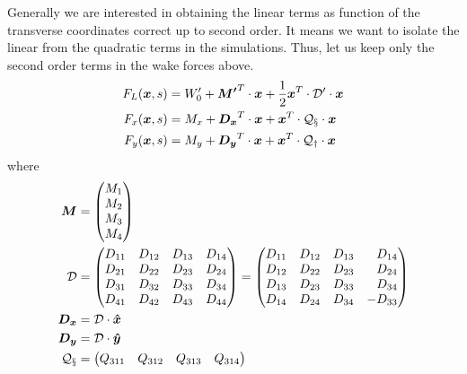\begin{apendicesenv}
    Generally we are interested in obtaining the linear terms as function of the transverse coordinates correct up to second order. It means we want to isolate the linear from the quadratic terms in the simulations. Thus, let us keep only the second order terms in the wake forces above.
    \begin{align}
		F_L(\boldsymbol{x},s) &= W_0' + \boldsymbol{M'}^T \cdot \boldsymbol{x} + \frac12\boldsymbol{x}^T \cdot \mathcal{D'}  \cdot \boldsymbol{x} \\
		F_x(\boldsymbol{x},s) &= M_x + \boldsymbol{D_x}^T \cdot \boldsymbol{x} +        \boldsymbol{x}^T \cdot \mathcal{Q_x} \cdot \boldsymbol{x} \\
		F_y(\boldsymbol{x},s) &= M_y + \boldsymbol{D_y}^T \cdot \boldsymbol{x} +        \boldsymbol{x}^T \cdot \mathcal{Q_y} \cdot \boldsymbol{x}
    \end{align}
    where
    \begin{align}
		\vect{M} &= \begin{pmatrix*}[r] M_{1}\\ M_{2}\\ M_{3}\\ M_{4}\end{pmatrix*} \\
		\tensor{D}  &= \begin{pmatrix*}[r] D_{11} & D_{12} & D_{13} & D_{14} \\
                                   D_{21} & D_{22} & D_{23} & D_{24} \\
                                   D_{31} & D_{32} & D_{33} & D_{34} \\
                                   D_{41} & D_{42} & D_{43} & D_{44}
               \end{pmatrix*} =
               \begin{pmatrix*}[r] D_{11} & D_{12} & D_{13} & D_{14} \\
                                   D_{12} & D_{22} & D_{23} & D_{24} \\
                                   D_{13} & D_{23} & D_{33} & D_{34} \\
                                   D_{14} & D_{24} & D_{34} & -D_{33}
               \end{pmatrix*}\\
		\vect{D_x} &= \tensor{D}\cdot \vect{\hat{x}} \\
		\vect{D_y} &= \tensor{D}\cdot \vect{\hat{y}} \\
		\tensor{Q_x}&= \begin{pmatrix*}[r] Q_{311} & Q_{312} & Q_{313} & Q_{314} \\

\end{pmatrix*}
\end{align}
\end{apendicesenv}
